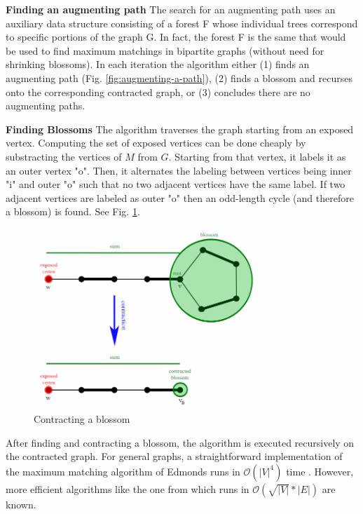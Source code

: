 \textbf{Finding an augmenting path} The search for an augmenting path uses an auxiliary data structure consisting of a forest F whose individual trees correspond to specific portions of the graph G. In fact, the forest F is the same that would be used to find maximum matchings in bipartite graphs (without need for shrinking blossoms). In each iteration the algorithm either (1) finds an augmenting path (Fig. \ref{fig:augmenting-a-path}), (2) finds a blossom and recurses onto the corresponding contracted graph, or (3) concludes there are no augmenting paths.

\textbf{Finding Blossoms}
The algorithm traverses the graph starting from an exposed vertex. Computing the set of exposed vertices can be done cheaply by substracting the vertices of $M$ from $G$. Starting from that vertex, it labels it as an outer vertex "o". Then, it alternates the labeling between vertices being inner "i" and outer "o" such that no two adjacent vertices have the same label. If two adjacent vertices are labeled as outer "o" then an odd-length cycle (and therefore a blossom) is found. See Fig. \ref{fig:contracting-a-blossom}.

\begin{figure}
	\centering
	\includegraphics[width=0.75\textwidth]{img/Edmonds_blossom_contraction}
	\caption{Contracting a blossom}
	\label{fig:contracting-a-blossom}
\end{figure}

After finding and contracting a blossom, the algorithm is executed recursively on the contracted graph. For general graphs, a straightforward implementation of the maximum matching algorithm of Edmonds runs in $\mathcal{O}(|V|^4)$ time \cite{papadimitriou1982combinatorial}. However, more efficient algorithms like the one from \cite{micali1980v} which runs in
$\mathcal{O}(\sqrt{|V|}*|E|)$ are known.

